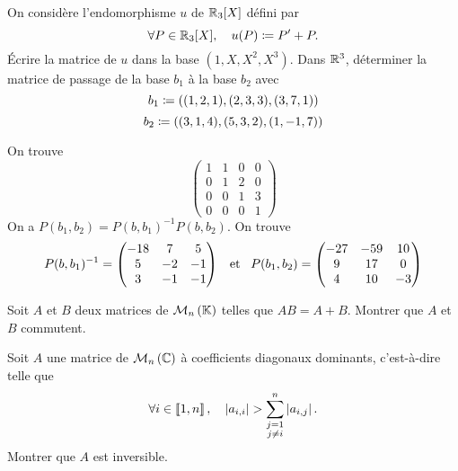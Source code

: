 \documentclass{magnolia}
\begin{document}
\begin{questions}
\question On considère l'endomorphisme $u$ de $\mathbb{R}_3[X]$ défini par
  \[\forall P\in\mathbb{R}_3[X] ,\quad u(P)\coloneqq P'+P.\]
  Écrire la matrice de $u$ dans la base $(1,X,X^2,X^3)$.
\question Dans $\mathbb{R}^3$, déterminer la matrice de passage de la base $b_1$ à la
  base $b_2$ avec
  \[b_1\coloneqq((1,2,1), (2,3,3), (3,7,1))\]
  \[b_2\coloneqq((3,1,4), (5,3,2), (1,-1,7))\]
\end{questions}
\begin{sol}
\begin{questions}
\question On trouve
  \[
  \begin{pmatrix}
  1 & 1 & 0 & 0\\
  0 & 1 & 2 & 0\\
  0 & 0 & 1 & 3\\
  0 & 0 & 0 & 1  
  \end{pmatrix}\]
\question On a $P(b_1,b_2)=P(b,b_1)^{-1}P(b,b_2)$. On trouve
  \[P(b,b_1)^{-1}=
  \begin{pmatrix}
  -18 & 7 & 5\\
  5 & -2 & -1\\
  3 & -1 & -1
  \end{pmatrix}
  \quad\!\text{et}\quad\! P(b_1,b_2)=
  \begin{pmatrix}
  -27 & -59 & 10\\
  9 & 17 & 0\\
  4 & 10 & -3 
  \end{pmatrix}\]
\end{questions}
\end{sol}


Soit $A$ et $B$ deux matrices de $\mathcal{M}_{n}\left(\mathbb{K}\right)$ telles que $AB=A+B$. Montrer
que $A$ et $B$ commutent.

Soit $A$ une matrice de $\mathcal{M}_{n}\left(\mathbb{C}\right)$ à coefficients diagonaux
  dominants, c'est-à-dire telle que
  \[\forall i\in\left\llbracket 1,n\right\rrbracket ,\quad \left|a_{i,i}\right| >
    \sum_{\substack{j=1\\ j\not=i}}^n \left|a_{i,j}\right|.\]
  Montrer que $A$ est inversible.


\end{document}
